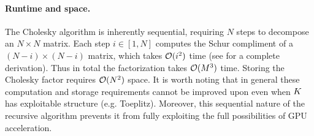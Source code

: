 \paragraph{Runtime and space.}
The Cholesky algorithm is inherently sequential, requiring $N$ steps to decompose an $N \times N$ matrix.
Each step $i \in [1, N]$ computes the Schur compliment of a $(N-i) \times (N-i)$ matrix, which takes $\bigo{i^2}$ time (see \citep[][Sec. 4.2]{golub2012matrix} for a complete derivation).
Thus in total the factorization takes $\bigo{M^3}$ time.
Storing the Cholesky factor requires $\bigo{N^2}$ space.
It is worth noting that in general these computation and storage requirements cannot be improved upon even when $K$ has exploitable structure (e.g. Toeplitz).
Moreover, this sequential nature of the recursive algorithm prevents it from fully exploiting the full possibilities of GPU acceleration.



